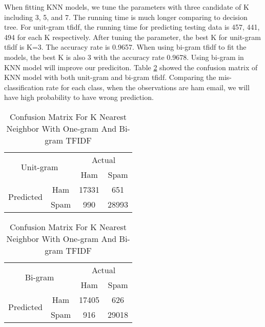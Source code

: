 When fitting KNN models, we tune the parameters with three candidate of K including 3, 5, and 7. The running time is much longer comparing to decision tree. For unit-gram tfidf, the running time for predicting testing data is 457, 441, 494 for each K respectively. After tuning the parameter, the best K for unit-gram tfidf is K=3. The accuracy rate is 0.9657. When using bi-gram tfidf to fit the models, the best K is also 3 with the accuracy rate 0.9678. Using bi-gram in KNN model will improve our prediciton. Table \ref{Confusion_KNN} showed the confusion matrix of KNN model with both unit-gram and bi-gram tfidf. Comparing the mis-classification rate for each class, when the observations are ham email, we will have high probability to have wrong prediction.\\

\begin{table}
\centering
\begin{subtable}{.5\textwidth}
\centering
\begin{tabular}{@{}|c|c|c|c|@{}}
\toprule
\multicolumn{2}{|c|}{\multirow{2}{*}{Unit-gram}} & \multicolumn{2}{c|}{Actual} \\ \cmidrule(l){3-4} 
\multicolumn{2}{|c|}{}                        & Ham          & Spam         \\ \midrule
\multirow{2}{*}{Predicted}       & Ham        & 17331        & 651          \\ \cmidrule(l){2-4} 
                                 & Spam       & 990          & 28993        \\ \bottomrule
\end{tabular}
\begin{tabular}{@{}|c|c|c|c|@{}}
\toprule
\multicolumn{2}{|c|}{\multirow{2}{*}{Bi-gram}} & \multicolumn{2}{c|}{Actual} \\ \cmidrule(l){3-4} 
\multicolumn{2}{|c|}{}                        & Ham          & Spam         \\ \midrule
\multirow{2}{*}{Predicted}       & Ham        & 17405        & 626          \\ \cmidrule(l){2-4} 
                                 & Spam       & 916          & 29018        \\ \bottomrule
\end{tabular}
\end{subtable}
\caption{Confusion Matrix For K Nearest Neighbor With One-gram And Bi-gram TFIDF}
\label{Confusion_KNN}
\end{table}